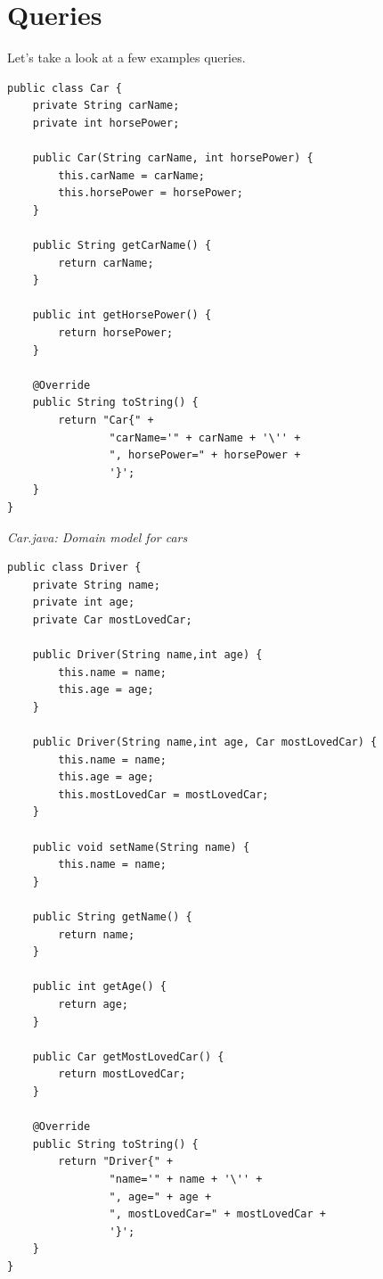 
\chapter{Queries}
\label{tut:queries}

Let's take a look at a few examples queries.

\begin{lstlisting}
public class Car {
    private String carName;
    private int horsePower;

    public Car(String carName, int horsePower) {
        this.carName = carName;
        this.horsePower = horsePower;
    }

    public String getCarName() {
        return carName;
    }

    public int getHorsePower() {
        return horsePower;
    }

    @Override
    public String toString() {
        return "Car{" +
                "carName='" + carName + '\'' +
                ", horsePower=" + horsePower +
                '}';
    }
}
\end{lstlisting}

{\small\itshape Car.java: Domain model for cars\par}
\medskip

\begin{lstlisting}
public class Driver {
    private String name;
    private int age;
    private Car mostLovedCar;

    public Driver(String name,int age) {
        this.name = name;
        this.age = age;
    }

    public Driver(String name,int age, Car mostLovedCar) {
        this.name = name;
        this.age = age;
        this.mostLovedCar = mostLovedCar;
    }

    public void setName(String name) {
        this.name = name;
    }

    public String getName() {
        return name;
    }

    public int getAge() {
        return age;
    }

    public Car getMostLovedCar() {
        return mostLovedCar;
    }

    @Override
    public String toString() {
        return "Driver{" +
                "name='" + name + '\'' +
                ", age=" + age +
                ", mostLovedCar=" + mostLovedCar +
                '}';
    }
}
\end{lstlisting}

